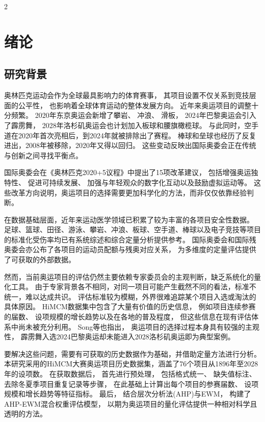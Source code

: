 \documentclass[twoside]{CUGThesis}
\begin{document}
\makeToc

\begin{spacing}{2}\section{绪论}\end{spacing}

\subsection{研究背景}

奥林匹克运动会作为全球最具影响力的体育赛事，
其项目设置不仅关系到竞技层面的公平性，
也影响着全球体育运动的整体发展方向\cite{Li2013}。
近年来奥运项目的调整十分频繁。
2020年东京奥运会新增了攀岩、
冲浪、
滑板，
2024年巴黎奥运会引入了霹雳舞，
2028年洛杉矶奥运会也计划加入板球和腰旗橄榄球。
与此同时，空手道在2020年首次亮相后，到2024年就被排除出了赛程。
棒球和垒球也经历了反复进出，2008年被移除，2020年又得以回归。
这些变动反映出国际奥委会正在传统与创新之间寻找平衡点。

国际奥委会在《奥林匹克2020+5议程》中提出了15项改革建议\cite{IOC2023}，
包括增强奥运独特性、
促进可持续发展、
加强与年轻观众的数字化互动以及鼓励虚拟运动等。
这些改革方向说明，奥运项目的选择需要更加科学化的方法，而非仅仅依靠经验判断。

在数据基础层面，近年来运动医学领域已积累了较为丰富的各项目安全性数据。
足球\cite{LopezValenciano2021}、篮球\cite{Lian2022}、田径\cite{Edouard2026}、游泳\cite{Chandran2021}、攀岩\cite{Schoffl2006}、冲浪\cite{McArthur2020}、板球\cite{Perera2019}、空手道\cite{Lystad2020}、棒球\cite{Bullock2018}以及电子竞技\cite{Tholl2022}等项目的标准化受伤率均已有系统综述和综合定量分析提供参考。
国际奥委会\cite{IOC2024}和国际残奥委会\cite{IPC2024}亦公布了各项目的运动员配额与残奥对应关系，
为多维度的定量评估提供了可获取的外部数据。

然而，当前奥运项目的评估仍然主要依赖专家委员会的主观判断，缺乏系统化的量化工具。
由于专家背景各不相同，对同一项目可能产生截然不同的看法，标准不统一，难以达成共识。
评估标准较为模糊，外界很难追踪某个项目入选或淘汰的具体原因。
HiMCM数据集中包含了大量有价值的历史信息，
例如项目连续参赛的届数、
设项规模的增长趋势以及在各地的普及程度，
但这些信息在现有评估体系中尚未被充分利用。
Song等\cite{Song2025}也指出，
奥运项目的选择过程本身具有较强的主观性，
霹雳舞入选2024巴黎奥运却未能进入2028洛杉矶奥运即为典型案例。

要解决这些问题，需要有可获取的历史数据作为基础，并借助定量方法进行分析。
本研究采用的HiMCM大赛奥运项目历史数据集，涵盖了76个项目从1896年至2028年的设项数。
在获取数据后，
首先进行预处理，
包括格式统一、
缺失值标注、
去除冬夏季项目重复记录等步骤，
在此基础上计算出每个项目的参赛届数、
设项规模和增长趋势等特征指标。
最后，
结合层次分析法(AHP)\cite{Saaty2007}与EWM\cite{Wang2019,Shannon1948}，
构建了AHP-EWM混合权重评估模型，
以期为奥运项目的量化评估提供一种相对科学且透明的方法。
\end{document}
